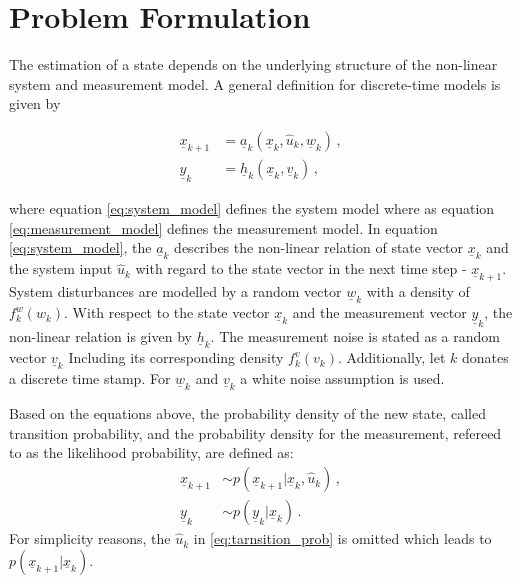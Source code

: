 \documentclass[a4paper]{IEEEtran}
\begin{document}
\section{Problem Formulation}
\label{ch:problem_formulation}

The estimation of a state depends on the underlying structure of the non-linear system and measurement model. A general definition for discrete-time models is given by

\begin{align}
    \underline{x}_{k+1}  &= \underline{a}_{k}(\underline{x}_{k}, \hat{u}_{k},  \underline{w}_{k}) \,,  \label{eq:system_model} \\
    \underline{y}_{k}    &= \underline{h}_{k}(\underline{x}_{k}, \underline{v}_{k}) \,, \label{eq:measurement_model}
\end{align}

where equation \eqref{eq:system_model} defines the system model where as equation \eqref{eq:measurement_model} defines the measurement model. In equation \eqref{eq:system_model}, 
the $\underline{a}_{k}$ describes the non-linear relation of state vector $\underline{x}_{k}$ and the system input $\hat{u}_{k}$ with regard to the state vector in the next time step - $\underline{x}_{k+1}$.
System disturbances are modelled by a random vector $\underline{w}_{k}$ with a density of $f^{w}_{k}(w_{k})$. With respect to the state vector $\underline{x}_{k}$ and the measurement vector $\underline{y}_{k}$,
the non-linear relation is given by $\underline{h}_{k}$. The measurement noise is stated as a random vector $\underline{v}_{k}$ Including its corresponding density $f^{v}_{k}(v_{k})$. Additionally, let $k$ donates a discrete time stamp.
For $\underline{w}_{k}$ and $\underline{v}_{k}$ a white noise assumption is used.

Based on the equations above, the probability density of the new state, called transition probability, and the probability density for the measurement, refereed to as the likelihood probability, are defined as:
\begin{align}
    \underline{x}_{k+1} &\sim p(\underline{x}_{k+1} \vert \underline{x}_{k}, \hat{u}_{k}) \,, \label{eq:tarnsition_prob} \\
    \underline{y}_{k} &\sim p(\underline{y}_{k} \vert \underline{x}_{k}) \,. \label{eq:likelihood_prob}
\end{align}
For simplicity reasons, the $\hat{u}_{k}$ in \eqref{eq:tarnsition_prob} is omitted which leads to $p(\underline{x}_{k+1} \vert \underline{x}_{k})$.
\end{document}
